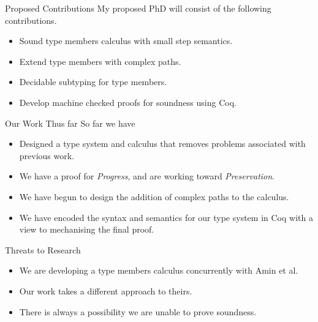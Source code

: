 \documentclass[dvipsnames]{beamer}
\begin{document}
\begin{frame}{Proposed Contributions}
My proposed PhD will consist of the following contributions.
\begin{itemize}
\item
Sound type members calculus with small step semantics.
\item
Extend type members with complex paths.
\item
Decidable subtyping for type members.
\item
Develop machine checked proofs for soundness using Coq.
\end{itemize}
\end{frame}

\begin{frame}{Our Work Thus far}
So far we have
\begin{itemize}
\item
Designed a type system and calculus that removes problems associated with previous work.
\item
We have a proof for \emph{Progress}, and are working toward \emph{Preservation}.
\item
We have begun to design the addition of complex paths to the calculus.
\item
We have encoded the syntax and semantics for our type system in Coq with a view to mechanising the final proof.
\end{itemize}
\end{frame}

\begin{frame}{Threats to Research}
\begin{itemize}
\item
We are developing a type members calculus concurrently with Amin et al.
\item
Our work takes a different approach to theirs.
\item
There is always a possibility we are unable to prove soundness.
\end{itemize}
\end{frame}
\end{document}
